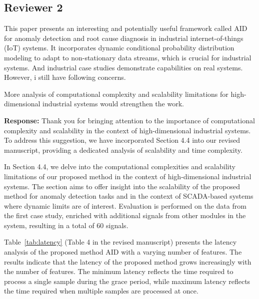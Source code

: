 \documentclass{article}
\makeatletter
\newenvironment{comment}{
\begin{sloppypar}\slshape
\vspace{5 mm}
\color{blue}
 \@beginparpenalty\@M
  \begin{list}{}{\setlength{\topsep}{0ex}%
  \setlength{\leftmargin}{\rightmargin}}\item[]
 \@beginparpenalty\@endparpenalty
}
{\end{list}
\end{sloppypar}
}
\makeatother
\begin{document}
\subsection*{Reviewer 2}
\begin{comment}
This paper presents an interesting and potentially useful framework called AID for anomaly detection and root cause diagnosis in industrial internet-of-things (IoT) systems. It incorporates dynamic conditional probability distribution modeling to adapt to non-stationary data streams, which is crucial for industrial systems. And industrial case studies demonstrate capabilities on real systems. However, i still have following concerns.
\end{comment}

\begin{enumerate}
  \item
        \begin{comment}
        More analysis of computational complexity and scalability limitations for high-dimensional industrial systems would strengthen the work.
        \end{comment}
        {\bf Response:}
        Thank you for bringing attention to the importance of computational complexity and scalability in the context of high-dimensional industrial systems. To address this suggestion, we have incorporated Section 4.4 into our revised manuscript, providing a dedicated analysis of scalability and time complexity.

        In Section 4.4, we delve into the computational complexities and scalability limitations of our proposed method in the context of high-dimensional industrial systems. The section aims to offer insight into the scalability of the proposed method for anomaly detection tasks and in the context of SCADA-based systems where dynamic limits are of interest. Evaluation is performed on the data from the first case study, enriched with additional signals from other modules in the system, resulting in a total of 60 signals. 
        
        Table~\ref{tab:latency} (Table 4 in the revised manuscript) presents the latency analysis of the proposed method AID with a varying number of features. The results indicate that the latency of the proposed method grows increasingly with the number of features. The minimum latency reflects the time required to process a single sample during the grace period, while maximum latency reflects the time required when multiple samples are processed at once.
        

\end{enumerate}
\end{document}
